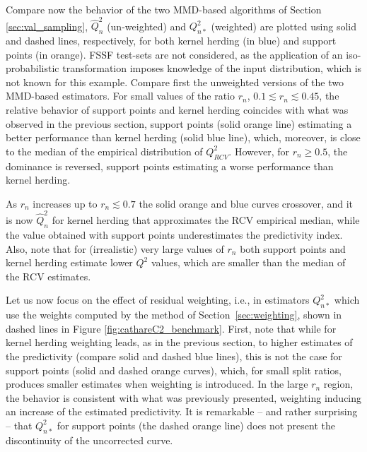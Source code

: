 Compare now the behavior of the two MMD-based algorithms of Section \ref{sec:val_sampling}, $\widehat Q^2_n$ (un-weighted) and $Q_{n*}^2$ (weighted) are plotted using solid and dashed lines, respectively, for both kernel herding (in blue) and support points (in orange). 
FSSF test-sets are not considered, as the application of an iso-probabilistic transformation imposes knowledge of the input distribution, which is not known for this example. 
Compare first the unweighted versions of the two MMD-based estimators. 
For small values of the ratio $r_n$, $0.1 \lesssim r_n \lesssim 0.45$, the relative behavior of support points and kernel herding coincides with what was observed in the previous section, 
support points (solid orange line) estimating a better performance than kernel herding (solid blue line), which, moreover, is close to the median of the empirical distribution of $Q^2_{RCV}$. 
However, for $r_n \geq 0.5$, the dominance is reversed, support points estimating a worse performance than kernel herding. 

As $r_n$ increases up to $r_n \lesssim 0.7$ the solid orange and blue curves crossover, and it is now $\widehat Q^2_n$ for kernel herding that approximates the RCV empirical median, while the value obtained with support points underestimates the predictivity index. 
Also, note that for (irrealistic) very large values of $r_n$ both support points and kernel herding estimate lower $Q^2$ values, which are smaller than the median of the RCV estimates.

Let us now focus on the effect of residual weighting, i.e., in estimators $Q_{n*}^2$ which use the weights computed by the method of Section~\ref{sec:weighting}, shown in dashed lines in Figure \ref{fig:cathareC2_benchmark}. 
First, note that while for kernel herding weighting leads, as in the previous section, to higher estimates of the predictivity (compare solid and dashed blue lines), this is not the case for support points (solid and dashed orange curves), which, for small split ratios, produces smaller estimates when weighting is introduced. 
In the large $r_n$ region, the behavior is consistent with what was previously presented, weighting inducing an increase of the estimated predictivity. 
It is remarkable -- and rather surprising -- that $Q_{n*}^2$ for support points (the dashed orange line) does not present the discontinuity of the uncorrected curve. 

